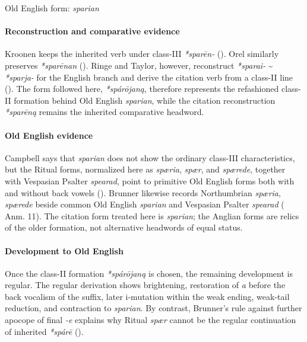 \documentclass[
  british,
  a4paper,
]{article}
\begin{document}
Old English form: \emph{sparian}

\paragraph{Reconstruction and comparative
evidence}\label{reconstruction-and-comparative-evidence-26}

Kroonen keeps the inherited verb under class-III \emph{*sparēn-}
(). Orel similarly
preserves \emph{*sparēnan} ().
Ringe and Taylor, however, reconstruct \emph{*sparai-} \textasciitilde{}
\emph{*sparja-} for the English branch and derive the citation verb from
a class-II line (). The form followed here, \emph{*spárōjaną}, therefore
represents the refashioned class-II formation behind Old English
\emph{sparian}, while the citation reconstruction \emph{*sparēną}
remains the inherited comparative headword.

\paragraph{Old English evidence}\label{old-english-evidence-26}

Campbell says that \emph{sparian} does not show the ordinary class-III
characteristics, but the Ritual forms, normalized here as \emph{spæria},
\emph{spær}, and \emph{spærede}, together with Vespasian Psalter
\emph{spearad}, point to primitive Old English forms both with and
without back vowels (). Brunner likewise records Northumbrian \emph{spæria},
\emph{spærede} beside common Old English \emph{sparian} and Vespasian
Psalter \emph{spearad} ( Anm. 11). The citation form treated here is \emph{sparian};
the Anglian forms are relics of the older formation, not alternative
headwords of equal status.

\paragraph{Development to Old
English}\label{development-to-old-english-26}

Once the class-II formation \emph{*spárōjaną} is chosen, the remaining
development is regular. The regular derivation shows brightening,
restoration of \emph{a} before the back vocalism of the suffix, later
i-mutation within the weak ending, weak-tail reduction, and contraction
to \emph{sparian}. By contrast, Brunner's rule against further apocope
of final \emph{-e} explains why Ritual \emph{spær} cannot be the regular
continuation of inherited \emph{*spárē}
().
\end{document}
